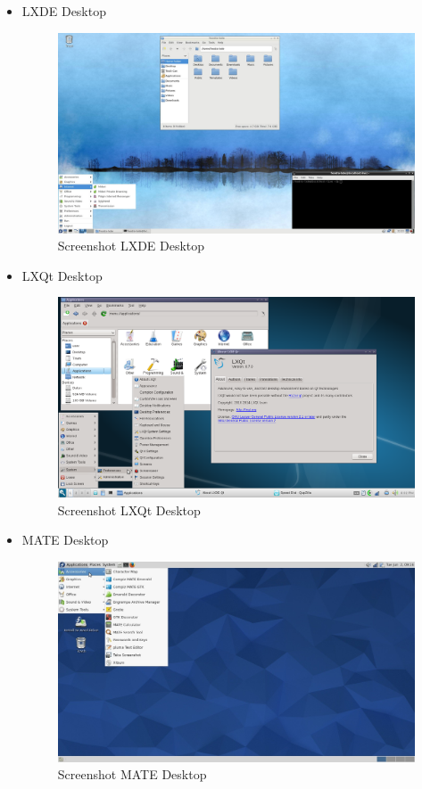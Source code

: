 \documentclass[12pt,]{article}
\begin{document}
\begin{itemize}
		\item LXDE Desktop
		\begin{figure}[H]
			\centering
			\includegraphics[width=0.8\linewidth]{images/vbox_de/lxde}
			\caption{Screenshot LXDE Desktop}
		\end{figure}
	
		\item LXQt Desktop
		\begin{figure}[H]
			\centering
			\includegraphics[width=0.8\linewidth]{images/vbox_de/lxqt}
			\caption{Screenshot LXQt Desktop}
		\end{figure}
	
		\item MATE Desktop
		\begin{figure}[H]
			\centering
			\includegraphics[width=0.8\linewidth]{images/vbox_de/mate}
			\caption{Screenshot MATE Desktop}
		\end{figure}
	

\end{itemize}
\end{document}
